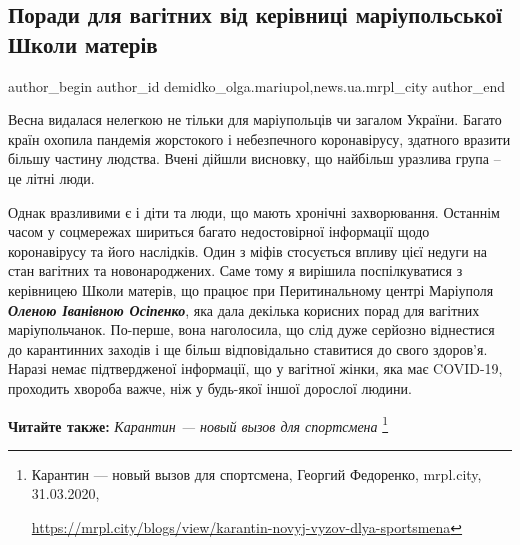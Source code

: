  
 
 
 
 
 
\subsection{Поради для вагітних від керівниці маріупольської Школи матерів}
\label{sec:01_04_2020.stz.news.ua.mrpl_city.1.porady_dlja_vagitnyh_kerivn_mrpl_shkola_materiv}
 
\ifcmt
 author_begin
   author_id demidko_olga.mariupol,news.ua.mrpl_city
 author_end
\fi

Весна видалася нелегкою не тільки для маріупольців чи загалом України. Багато
країн охопила пандемія жорстокого і небезпечного коронавірусу, здатного вразити
більшу частину людства. Вчені дійшли висновку, що найбільш уразлива група – це
літні люди.

Однак вразливими є і діти та люди, що мають хронічні захворювання. Останнім
часом у соцмережах шириться багато недостовірної інформації щодо коронавірусу
та його наслідків. Один з міфів стосується впливу цієї недуги на стан вагітних
та новонароджених. Саме тому я вирішила поспілкуватися з керівницею Школи
матерів, що працює при Перитинальному центрі Маріуполя \emph{\textbf{Оленою Іванівною
Осіпенко}}, яка дала декілька корисних порад для вагітних маріупольчанок.
По-перше, вона наголосила, що слід дуже серйозно віднестися до карантинних
заходів і ще більш відповідально ставитися до свого здоров'я. Наразі немає
підтвердженої інформації, що у вагітної жінки, яка має COVID-19, проходить
хвороба важче, ніж у будь-якої іншої дорослої людини.

\textbf{Читайте также:} \emph{Карантин — новый вызов для спортсмена}%
\footnote{Карантин — новый вызов для спортсмена, Георгий Федоренко, mrpl.city, 31.03.2020, \par%
\url{https://mrpl.city/blogs/view/karantin-novyj-vyzov-dlya-sportsmena}
}

